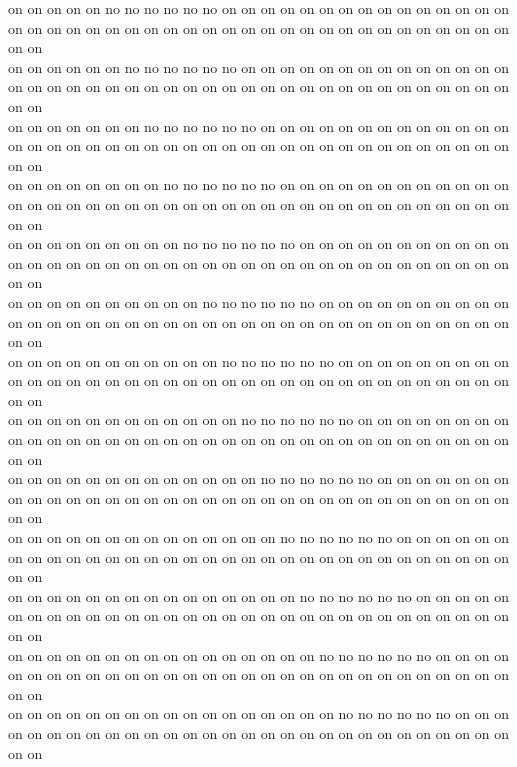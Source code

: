 on on on on on no no no no no no on on on on on on on on on on on on on on on on on on on on on on on on on on on on on on on on on on on on on on on on on on on\\
on on on on on on no no no no no no on on on on on on on on on on on on on on on on on on on on on on on on on on on on on on on on on on on on on on on on on on\\
on on on on on on on no no no no no no on on on on on on on on on on on on on on on on on on on on on on on on on on on on on on on on on on on on on on on on on\\
on on on on on on on on no no no no no no on on on on on on on on on on on on on on on on on on on on on on on on on on on on on on on on on on on on on on on on\\
on on on on on on on on on no no no no no no on on on on on on on on on on on on on on on on on on on on on on on on on on on on on on on on on on on on on on on\\
on on on on on on on on on on no no no no no no on on on on on on on on on on on on on on on on on on on on on on on on on on on on on on on on on on on on on on\\
on on on on on on on on on on on no no no no no no on on on on on on on on on on on on on on on on on on on on on on on on on on on on on on on on on on on on on\\
on on on on on on on on on on on on no no no no no no on on on on on on on on on on on on on on on on on on on on on on on on on on on on on on on on on on on on\\
on on on on on on on on on on on on on no no no no no no on on on on on on on on on on on on on on on on on on on on on on on on on on on on on on on on on on on\\
on on on on on on on on on on on on on on no no no no no no on on on on on on on on on on on on on on on on on on on on on on on on on on on on on on on on on on\\
on on on on on on on on on on on on on on on no no no no no no on on on on on on on on on on on on on on on on on on on on on on on on on on on on on on on on on\\
on on on on on on on on on on on on on on on on no no no no no no on on on on on on on on on on on on on on on on on on on on on on on on on on on on on on on on\\
on on on on on on on on on on on on on on on on on no no no no no no on on on on on on on on on on on on on on on on on on on on on on on on on on on on on on on\\
